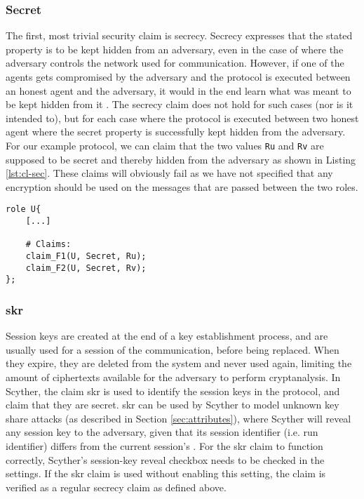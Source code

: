 \subsubsection{Secret}


The first, most trivial security claim is secrecy. Secrecy expresses that the stated property is to be kept hidden from an adversary, even in the case of where the adversary controls the network used for communication. However, if one of the agents gets compromised by the adversary and the protocol is executed between an honest agent and the adversary, it would in the end learn what was meant to be kept hidden from it \cite{cremers2005operational}. The secrecy claim does not hold for such cases (nor is it intended to), but for each case where the protocol is executed between two honest agent where the secret property is successfully kept hidden from the adversary. For our example protocol, we can claim that the two values \texttt{Ru} and \texttt{Rv} are supposed to be secret and thereby hidden from the adversary as shown in Listing \ref{lst:cl-sec}. These claims will obviously fail as we have not specified that any encryption should be used on the messages that are passed between the two roles.\newline

\newpage

\begin{lstlisting}[caption={Example of how to claim secrecy for terms in Scyther.}, label={lst:cl-sec}]
role U{
	[...]
	
	# Claims:
	claim_F1(U, Secret, Ru);
	claim_F2(U, Secret, Rv);
};
\end{lstlisting}




\subsubsection{\gls{skr}}

Session keys are created at the end of a key establishment process, and are usually used for a session of the communication, before being replaced. When they expire, they are deleted from the system and never used again, limiting the amount of ciphertexts available for the adversary to perform cryptanalysis. In Scyther, the claim \gls{skr} is used to identify the session keys in the protocol, and claim that they are secret.  \gls{skr} can be used by Scyther to model unknown key share attacks (as described in Section \ref{sec:attributes}), where Scyther will reveal any session key to the adversary, given that its session identifier (i.e. run identifier) differs from the current session's \cite{cremers2014improving}. For the \gls{skr} claim to function correctly, Scyther's session-key reveal checkbox needs to be checked in the settings. If the \gls{skr} claim is used without enabling this setting, the claim is verified as a regular secrecy claim as defined above.

